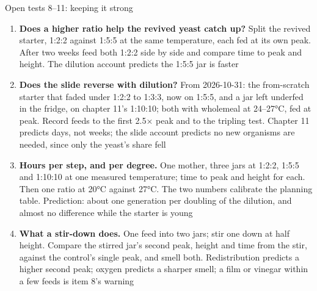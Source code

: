 \documentclass[aspectratio=169,11pt]{beamer}
\begin{document}
\begin{frame}{Open tests 8--11: keeping it strong \untested}
  \scriptsize
  \begin{enumerate}\setlength{\itemsep}{3pt}
    \setcounter{enumi}{7}
    \item \textbf{Does a higher ratio help the revived yeast catch up?} Split the revived starter, 1:2:2 against 1:5:5 at the same temperature, each fed at its own peak. After two weeks feed both 1:2:2 side by side and compare time to peak and height. The dilution account predicts the 1:5:5 jar is faster
    \item \textbf{Does the slide reverse with dilution?} From 2026-10-31: the from-scratch starter that faded under 1:2:2 to 1:3:3, now on 1:5:5, and a jar left underfed in the fridge, on chapter 11's 1:10:10; both with wholemeal at 24--27°C, fed at peak. Record feeds to the first 2.5× peak and to the tripling test. Chapter 11 predicts days, not weeks; the slide account predicts no new organisms are needed, since only the yeast's share fell
    \item \textbf{Hours per step, and per degree.} One mother, three jars at 1:2:2, 1:5:5 and 1:10:10 at one measured temperature; time to peak and height for each. Then one ratio at 20°C against 27°C. The two numbers calibrate the planning table. Prediction: about one generation per doubling of the dilution, and almost no difference while the starter is young
    \item \textbf{What a stir-down does.} One feed into two jars; stir one down at half height. Compare the stirred jar's second peak, height and time from the stir, against the control's single peak, and smell both. Redistribution predicts a higher second peak; oxygen predicts a sharper smell; a film or vinegar within a few feeds is item 8's warning
  \end{enumerate}
\end{frame}
\end{document}
